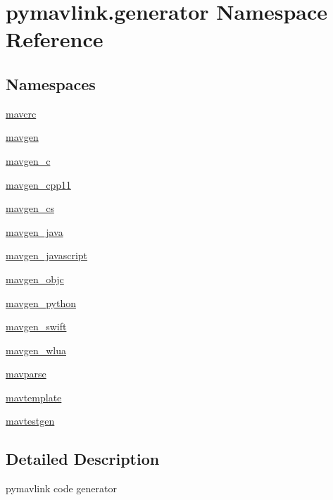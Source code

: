 \hypertarget{namespacepymavlink_1_1generator}{}\section{pymavlink.\+generator Namespace Reference}
\label{namespacepymavlink_1_1generator}
\subsection*{Namespaces}
\begin{DoxyCompactItemize}
\item 
 \mbox{\hyperlink{namespacepymavlink_1_1generator_1_1mavcrc}{mavcrc}}
\item 
 \mbox{\hyperlink{namespacepymavlink_1_1generator_1_1mavgen}{mavgen}}
\item 
 \mbox{\hyperlink{namespacepymavlink_1_1generator_1_1mavgen__c}{mavgen\+\_\+c}}
\item 
 \mbox{\hyperlink{namespacepymavlink_1_1generator_1_1mavgen__cpp11}{mavgen\+\_\+cpp11}}
\item 
 \mbox{\hyperlink{namespacepymavlink_1_1generator_1_1mavgen__cs}{mavgen\+\_\+cs}}
\item 
 \mbox{\hyperlink{namespacepymavlink_1_1generator_1_1mavgen__java}{mavgen\+\_\+java}}
\item 
 \mbox{\hyperlink{namespacepymavlink_1_1generator_1_1mavgen__javascript}{mavgen\+\_\+javascript}}
\item 
 \mbox{\hyperlink{namespacepymavlink_1_1generator_1_1mavgen__objc}{mavgen\+\_\+objc}}
\item 
 \mbox{\hyperlink{namespacepymavlink_1_1generator_1_1mavgen__python}{mavgen\+\_\+python}}
\item 
 \mbox{\hyperlink{namespacepymavlink_1_1generator_1_1mavgen__swift}{mavgen\+\_\+swift}}
\item 
 \mbox{\hyperlink{namespacepymavlink_1_1generator_1_1mavgen__wlua}{mavgen\+\_\+wlua}}
\item 
 \mbox{\hyperlink{namespacepymavlink_1_1generator_1_1mavparse}{mavparse}}
\item 
 \mbox{\hyperlink{namespacepymavlink_1_1generator_1_1mavtemplate}{mavtemplate}}
\item 
 \mbox{\hyperlink{namespacepymavlink_1_1generator_1_1mavtestgen}{mavtestgen}}
\end{DoxyCompactItemize}


\subsection{Detailed Description}
\begin{DoxyVerb}pymavlink code generator\end{DoxyVerb}
 